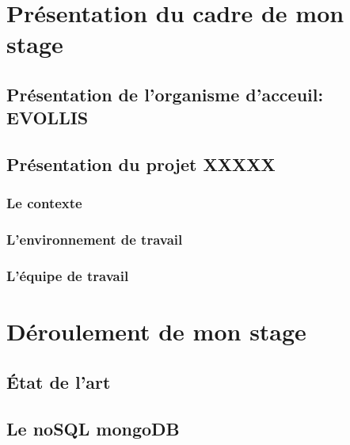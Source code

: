 \documentclass[12pt]{report}
\begin{document}




\begin{abstract}
  
\end{abstract}

\tableofcontents
\listoffigures
\listoftables





\part{Présentation du cadre de mon stage}

\chapter{Présentation de l'organisme d'acceuil: {\bf EVOLLIS}}


\chapter{Présentation du projet XXXXX}
\section{Le contexte}
\section{L'environnement de travail}
\section{L'équipe de travail}

\hypersetup{linkcolor=red,citecolor=red}

\part{Déroulement de mon stage}
\chapter{État de l'art}

\chapter{Le noSQL mongoDB}

\end{document}
